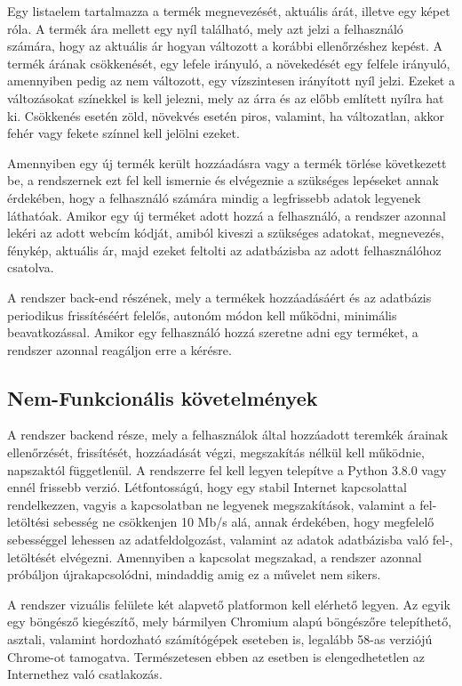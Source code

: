 Egy listaelem tartalmazza a termék megnevezését, aktuális árát, illetve egy képet róla. A termék ára mellett egy nyíl található, mely azt jelzi a felhasználó számára, hogy az aktuális ár hogyan változott a korábbi ellenőrzéshez kepést. A termék árának csökkenését, egy lefele irányuló, a növekedését egy felfele irányuló, amennyiben pedig az nem változott, egy vízszintesen irányított nyíl jelzi. Ezeket a változásokat színekkel is kell jelezni, mely az árra és az előbb említett nyílra hat ki. Csökkenés esetén zöld, növekvés esetén piros, valamint, ha változatlan, akkor fehér vagy fekete színnel kell jelölni ezeket.

Amennyiben egy új termék került hozzáadásra vagy a termék törlése következett be, a rendszernek ezt fel kell ismernie és elvégeznie a szükséges lepéseket annak érdekében, hogy a felhasználó számára mindig a legfrissebb adatok legyenek láthatóak. Amikor egy új terméket adott hozzá a felhasználó, a rendszer azonnal lekéri az adott webcím kódját, amiból kiveszi a szükséges adatokat, megnevezés, fénykép, aktuális ár, majd ezeket feltolti az adatbázisba az adott felhasználóhoz csatolva.

A rendszer back-end részének, mely a termékek hozzáadásáért és az adatbázis periodikus frissítéséért felelős, autonóm módon kell működni, minimális beavatkozással. Amikor egy felhasználó hozzá szeretne adni egy terméket, a rendszer azonnal reagáljon erre a kérésre.

\subsection{Nem-Funkcionális követelmények}

A rendszer backend része, mely a felhasználok által hozzáadott teremkék árainak ellenőrzését, frissítését, hozzáadását végzi, megszakítás nélkül kell működnie, napszaktól függetlenül. A rendszerre fel kell legyen telepítve a Python 3.8.0 vagy ennél frissebb verzió. Létfontosságú, hogy egy stabil Internet kapcsolattal rendelkezzen, vagyis a kapcsolatban ne legyenek megszakítások, valamint a fel-letöltési sebesség ne csökkenjen 10 Mb/s alá, annak érdekében, hogy megfelelő sebességgel lehessen az adatfeldolgozást, valamint az adatok adatbázisba való fel-, letöltését elvégezni. Amennyiben a kapcsolat megszakad, a rendszer azonnal próbáljon újrakapcsolódni, mindaddig amig ez a művelet nem sikers.

A rendszer vizuális felülete két alapvető platformon kell elérhető legyen. Az egyik egy böngésző kiegészítő, mely bármilyen Chromium alapú böngészőre telepíthető, asztali, valamint hordozható számítógépek eseteben is, legalább 58-as verziójú Chrome-ot tamogatva. Természetesen ebben az esetben is elengedhetetlen az Internethez való csatlakozás.

